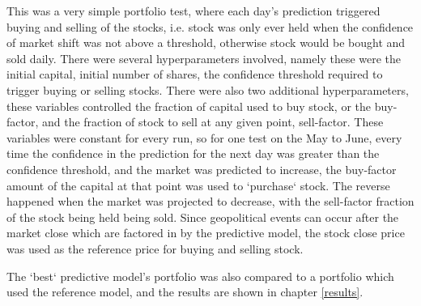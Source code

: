 This was a very simple portfolio test, where each day's prediction triggered buying and selling of the stocks, i.e. stock was only ever held when the confidence of market shift was not above a threshold, otherwise stock would be bought and sold daily. There were several hyperparameters involved, namely these were the initial capital, initial number of shares, the confidence threshold required to trigger buying or selling stocks. There were also two additional hyperparameters, these variables controlled the fraction of capital used to buy stock, or the buy-factor, and the fraction of stock to sell at any given point, sell-factor. These variables were constant for every run, so for one test on the May to June, every time the confidence in the prediction for the next day was greater than the confidence threshold, and the market was predicted to increase, the buy-factor amount of the capital at that point was used to `purchase` stock. The reverse happened when the market was projected to decrease, with the sell-factor fraction of the stock being held being sold. Since geopolitical events can occur after the market close which are factored in by the predictive model, the stock close price was used as the reference price for buying and selling stock. 

The `best` predictive model's portfolio was also compared to a portfolio which used the reference model, and the results are shown in chapter \ref{results}.
